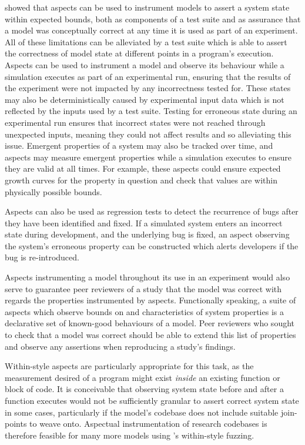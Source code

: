  showed that aspects can
be used to instrument models to assert a system state within expected bounds,
both as components of a test suite and as assurance that a model was
conceptually correct at any time it is used as part of an experiment. All of
these limitations can be alleviated by a test suite which is able to assert the
correctness of model state at different points in a program's execution. Aspects
can be used to instrument a model and observe its behaviour while a simulation
executes as part of an experimental run, ensuring that the results of the
experiment were not impacted by any incorrectness tested for. These states may
also be deterministically caused by experimental input data which is not
reflected by the inputs used by a test suite. Testing for erroneous state during
an experimental run ensures that incorrect states were not reached through
unexpected inputs, meaning they could not affect results and so alleviating this
issue. Emergent properties of a system may also be tracked over time, and
aspects may measure emergent properties while a simulation executes to ensure
they are valid at all times. For example, these aspects could ensure expected
growth curves for the property in question and check that values are within
physically possible bounds.

Aspects can also be used as regression tests to detect the recurrence of bugs
after they have been identified and fixed. If a simulated system enters an
incorrect state during development, and the underlying bug is fixed, an aspect
observing the system's erroneous property can be constructed which alerts
developers if the bug is re-introduced.

Aspects instrumenting a model throughout its use in an experiment would also
serve to guarantee peer reviewers of a study that the model was correct with
regards the properties instrumented by aspects. Functionally speaking, a suite
of aspects which observe bounds on and characteristics of system properties is a
declarative set of known-good behaviours of a model. Peer reviewers who sought
to check that a model was correct should be able to extend this list of
properties and observe any assertions when reproducing a study's findings.

Within-style aspects are particularly appropriate for this task, as the
measurement desired of a program might exist \emph{inside} an existing function or
block of code. It is conceivable that observing system state before and after a
function executes would not be sufficiently granular to assert correct system
state in some cases, particularly if the model's codebase does not include
suitable join-points to weave onto. Aspectual instrumentation of research codebases is
therefore feasible for many more models using \pdsfthree{}'s within-style fuzzing.

